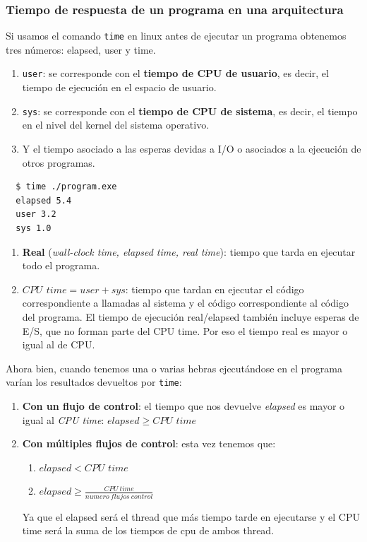 \documentclass[10pt,a4paper,spanish]{report}
\begin{document}
\textcolor[rgb]{0.2,0.4,0.8}{\subsubsection{Tiempo de respuesta de un programa en una arquitectura}}
Si usamos el comando \verb*|time| en linux antes de ejecutar un programa obtenemos tres números: elapsed, user y time.
\begin{enumerate}[\color{azul}{\bf $\heartsuit$}]
  \item \verb*|user|: se corresponde con el \textbf{\textcolor[rgb]{0.2,0.4,0.8}{tiempo de CPU de usuario}}, es decir, el tiempo de ejecución en el espacio de usuario.
  \item \verb*|sys|: se corresponde con el \textbf{\textcolor[rgb]{0.2,0.4,0.8}{tiempo de CPU de sistema}}, es decir, el tiempo en el nivel del kernel del sistema operativo.
  \item Y el tiempo asociado a las esperas devidas a I/O o asociados a la ejecución de otros programas.
\end{enumerate}


\begin{verbatim}
  $ time ./program.exe
  elapsed 5.4
  user 3.2
  sys 1.0
\end{verbatim}


\begin{enumerate}[\color{azul}{\bf $\heartsuit$}]
  \item \textcolor[rgb]{0.2,0.4,0.8}{\textbf{Real} (\textit{wall-clock time, elapsed time, real time})}: tiempo que tarda en ejecutar todo el programa.
  \item \textbf{\textcolor[rgb]{0.2,0.4,0.8}{$CPU$ $time=user+sys$}}: tiempo que tardan en ejecutar el código correspondiente a llamadas al sistema y el código correspondiente al código del programa. El tiempo de ejecución real/elapsed también incluye esperas de E/S, que no forman parte del CPU time. Por eso el tiempo real es mayor o igual al de CPU.
\end{enumerate}


Ahora bien, cuando tenemos una o varias hebras ejecutándose en el programa varían los resultados devueltos por \verb*|time|: 
\begin{enumerate}[\color{azul}{\bf $\heartsuit$}]
  \item \textbf{\textcolor[rgb]{0.2,0.4,0.8}{Con un flujo de control}}: 
  el tiempo que nos devuelve \textit{\textcolor[rgb]{0.2,0.4,0.8}{elapsed}} es mayor o igual al \textit{\textcolor[rgb]{0.2,0.4,0.8}{CPU time}}: $elapsed \geq CPU$ $time$
  \item \textbf{\textcolor[rgb]{0.2,0.4,0.8}{Con múltiples flujos de control}}: esta vez tenemos que:
  \begin{enumerate}[$\longrightarrow$]
   \item $elapsed < CPU$ $time$
   \item $elapsed \geq \frac{CPU~time}{numero~flujos~control}$
  \end{enumerate}
  Ya que el elapsed será el thread que más tiempo tarde en ejecutarse y el CPU time será la suma de los tiempos de cpu de ambos thread.
\end{enumerate}
\end{document}
